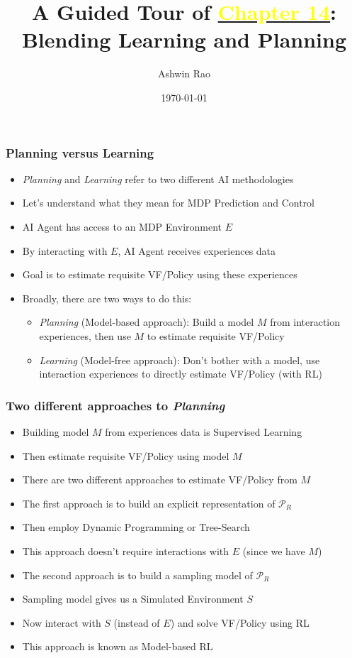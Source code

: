 \documentclass[handout]{beamer}
\title[Blending Learning and Planning Chapter]{A Guided Tour of \href{http://stanford.edu/~ashlearn/RLForFinanceBook/book.pdf}{\underline{\textcolor{yellow}{Chapter 14}}}: \\ Blending Learning and Planning} %
\author{Ashwin Rao} %
\institute[Stanford] %
{
ICME, Stanford University
}
\date{\today} %
\begin{document}
\begin{frame}
\titlepage %
\end{frame}

\begin{frame}
\frametitle{Planning versus Learning}
\pause
\begin{itemize}[<+->]
\item {\em Planning} and {\em Learning} refer to two different AI methodologies
\item Let's understand what they mean for MDP Prediction and Control
\item AI Agent has access to an MDP Environment $E$
\item By interacting with $E$, AI Agent receives experiences data
\item Goal is to estimate requisite VF/Policy using these experiences
\item Broadly, there are two ways to do this:
\begin{itemize}[<+->]
\item {\em Planning} (Model-based approach): Build a model $M$ from interaction experiences, then use $M$ to estimate requisite VF/Policy
\item {\em Learning} (Model-free approach): Don't bother with a model, use interaction experiences to directly estimate VF/Policy (with RL)
\end{itemize}
\end{itemize}
\end{frame}


\begin{frame}
\frametitle{Two different approaches to {\em Planning}}
\pause
\begin{itemize}[<+->]
\item Building model $M$ from experiences data is Supervised Learning
\item Then estimate requisite VF/Policy using model $M$
\item There are two different approaches to estimate VF/Policy from $M$
\item The first approach is to build an explicit representation of  $\mathcal{P}_R$
\item Then employ Dynamic Programming or Tree-Search
\item This approach doesn't require interactions with $E$ (since we have $M$)
\item The second approach is to build a sampling model of $\mathcal{P}_R$
\item Sampling model gives us a Simulated Environment $S$
\item Now interact with $S$ (instead of $E$) and solve VF/Policy using RL
\item This approach is known as Model-based RL
\end{itemize}
\end{frame}
\end{document}
